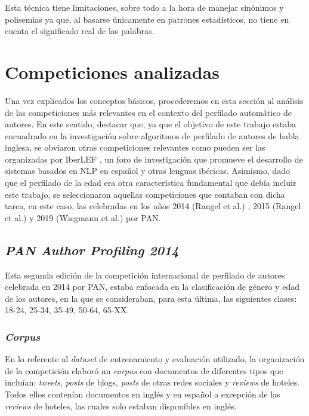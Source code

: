 \bigskip
Esta técnica tiene limitaciones, sobre todo a la hora de manejar sinónimos y polisemias ya que, al basarse únicamente en patrones estadísticos,
no tiene en cuenta el significado real de las palabras.

\section{Competiciones analizadas}
\label{sec:competiciones_analizados}

Una vez explicados los conceptos básicos, procederemos en esta sección al análisis de las competiciones más relevantes en el contexto
del perfilado automático de autores. En este sentido, destacar que, ya que el objetivo de este trabajo estaba encuadrado en
la investigación sobre algoritmos de perfilado de autores de habla inglesa, se obviaron otras competiciones relevantes como pueden ser
las organizadas por IberLEF \cite{iberlef}, un foro de investigación que promueve el desarrollo de sistemas basados en NLP en español y otras
lenguas ibéricas.
Asimismo, dado que el perfilado de la edad era otra característica fundamental que debía incluir este trabajo, se seleccionaron aquellas competiciones
que contaban con dicha tarea, en este caso, las celebradas en los años 2014 (Rangel et al.) \cite{rangel2014overview}, 2015 (Rangel et al.) \cite{rangel2015overview} y 2019 (Wiegmann et al.) \cite{wiegmann2019overview}
por PAN.

\subsection{\textit{PAN Author Profiling 2014}}

Esta segunda edición de la competición internacional de perfilado de autores celebrada en 2014 por PAN, estaba enfocada en la clasificación de género y edad de los autores, en la que se consideraban, para esta última, las siguientes
clases: 18-24, 25-34, 35-49, 50-64, 65-XX.

\subsubsection{\textit{Corpus}}

En lo referente al \textit{dataset} de entrenamiento y evaluación utilizado, la organización de la
competición elaboró un \textit{corpus} con documentos de diferentes tipos que incluían: \textit{tweets}, \textit{posts} de blogs, \textit{posts} de otras redes sociales y \textit{reviews} de hoteles.
Todos ellos contenían documentos en inglés y en español a excepción de las \textit{reviews} de hoteles, las cuales solo estaban disponibles en inglés.

